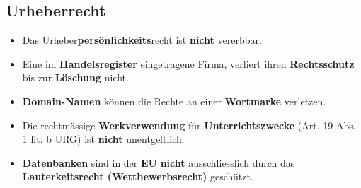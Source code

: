 \subsection{Urheberrecht}
\begin{itemize}
	\item Das Urheber\textbf{persönlichkeits}recht ist \textbf{nicht} vererbbar.
	\item Eine im \textbf{Handelsregister} eingetragene Firma, verliert ihren \textbf{Rechtsschutz} bis zur \textbf{Löschung} nicht.
	\item \textbf{Domain-Namen} können die Rechte an einer \textbf{Wortmarke} verletzen.
	\item Die rechtmässige \textbf{Werkverwendung} für \textbf{Unterrichtszwecke} (Art. 19 Abs. 1 lit. b URG) ist \textbf{nicht} unentgeltlich.
	\item \textbf{Datenbanken} sind in der \textbf{EU} \textbf{nicht} ausschliesslich durch das \textbf{Lauterkeitsrecht (Wettbewerbsrecht)} geschützt.
\end{itemize}

